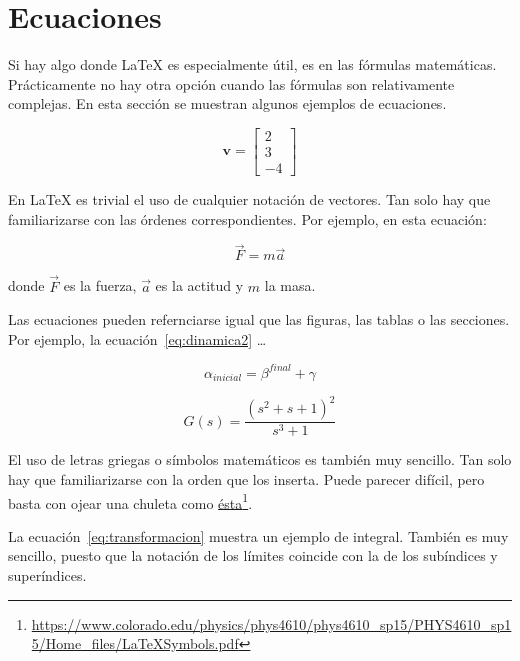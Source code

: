 \section{Ecuaciones} 
\label{sec:ecuaciones}

Si hay algo donde \LaTeX{} es especialmente útil, es en las fórmulas matemáticas.  Prácticamente no hay otra opción cuando las fórmulas son relativamente complejas.  En esta sección se muestran algunos ejemplos de ecuaciones.

\begin{equation}
    \mathbf{v} = \left[
    \begin{array}{c}
        2 \\
        3 \\
        -4 
    \end{array}
    \right]
\end{equation}

En \LaTeX{} es trivial el uso de cualquier notación de vectores.  Tan solo hay que familiarizarse con las órdenes correspondientes.  Por ejemplo, en esta ecuación:

\begin{equation} 
\vec{F} = m \vec{a}
\label{eq:dinamica}
\end{equation}

donde $\vec{F}$ es la fuerza, $\vec{a}$ es la actitud y $m$ la masa.

Las ecuaciones pueden refernciarse igual que las figuras, las tablas o las secciones.  Por ejemplo, la ecuación~\ref{eq:dinamica2} \ldots

\begin{equation} 
\alpha_{inicial} = \beta^{final} + \gamma
\label{eq:dinamica2}
\end{equation}

\begin{equation}
G(s)=\frac{(s^2+s+1)^2}{s^3+1}
\label{eq:dinamica3}
\end{equation}

El uso de letras griegas o símbolos matemáticos es también muy sencillo.  Tan solo hay que familiarizarse con la orden que los inserta.  Puede parecer difícil, pero basta con ojear una chuleta como \href{https://www.colorado.edu/physics/phys4610/phys4610_sp15/PHYS4610_sp15/Home_files/LaTeXSymbols.pdf}{ésta}\footnote{\url{https://www.colorado.edu/physics/phys4610/phys4610_sp15/PHYS4610_sp15/Home_files/LaTeXSymbols.pdf}}.

La ecuación~\ref{eq:transformacion} muestra un ejemplo de integral.  También es muy sencillo, puesto que la notación de los límites coincide con la de los subíndices y superíndices.


